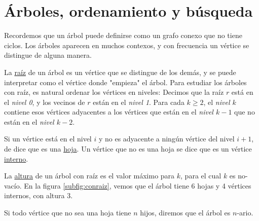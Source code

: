 \section{Árboles, ordenamiento y búsqueda}

Recordemos que un árbol puede definirse como un grafo conexo que no tiene ciclos. Los árboles aparecen en muchos contexos, y con frecuencia un vértice se distingue de alguna manera.

\begin{defn}
    La \ul{raíz} de un árbol es un vértice que se distingue de los demás, y se puede interpretar como el vértice donde "empieza" el árbol. Para estudiar los árboles con raíz, es natural ordenar los vértices en niveles: Decimos que la raíz $r$ está en el \textit{nivel 0}, y los vecinos de $r$ están en el \textit{nivel 1}. Para cada $k \geq 2$, el \textit{nivel $k$} contiene esos vértices adyacentes a los vértices que están en el \textit{nivel $k-1$} que no están en el \textit{nivel $k-2$}.
    
    Si un vértice está en el nivel $i$ y no es adyacente a ningún vértice del nivel $i+1$, de dice que es una \ul{hoja}. Un vértice que no es una hoja se dice que es un vértice \ul{interno}.
    
    La \ul{altura} de un árbol con raíz es el valor máximo para $k$, para el cual $k$ es no-vacío. En la figura \ref{subfig:conraiz}, vemos que el árbol tiene 6 hojas y 4 vértices internos, con altura 3.
    
    Si todo vértice que no sea una hoja tiene $n$ hijos, diremos que el árbol es $n$-ario.
\end{defn}

\vspace{5mm}

